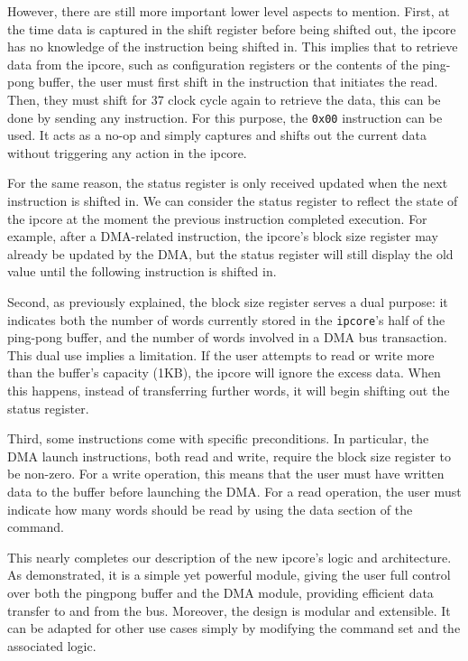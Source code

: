 \documentclass[a4paper,11pt,oneside]{report}
\begin{document}
However, there are still more important lower level aspects to mention. 
First, at the time data is captured in the shift register before being shifted out, 
the ipcore has no knowledge of the instruction being shifted in. 
This implies that to retrieve data from the ipcore, such as configuration registers 
or the contents of the ping-pong buffer, the user must first shift in the instruction that initiates the read. 
Then, they must shift for 37 clock cycle again to retrieve the data, this can be done by sending any instruction.
For this purpose, the \texttt{0x00} instruction can be used. 
It acts as a no-op and simply captures and shifts out the current data without triggering any action in the ipcore.

For the same reason, the status register is only received updated when the next instruction is shifted in. 
We can consider the status register to reflect the state of the ipcore 
at the moment the previous instruction completed execution. 
For example, after a DMA-related instruction, 
the ipcore's block size register may already be updated by the DMA, 
but the status register will still display the old value until the following instruction is shifted in.


Second, as previously explained, the block size register serves a dual purpose:
it indicates both the number of words currently stored in the \texttt{ipcore}'s half of the ping-pong buffer,
and the number of words involved in a DMA bus transaction.
This dual use implies a limitation. If the user attempts to read or write more than the buffer's capacity (1KB), 
the ipcore will ignore the excess data. When this happens, instead of transferring further words,
it will begin shifting out the status register.

Third, some instructions come with specific preconditions. 
In particular, the DMA launch instructions, both read and write, require the block size register to be non-zero.
For a write operation, this means that the user must have written data to the buffer before launching the DMA.
For a read operation, the user must indicate how many words should be read by using the data section of the command.

This nearly completes our description of the new ipcore's logic and architecture. 
As demonstrated, it is a simple yet powerful module, giving the user full control over both the pingpong buffer and the DMA module, providing efficient data transfer to and from the bus.
Moreover, the design is modular and extensible. 
It can be adapted for other use cases simply by modifying the command set and the associated logic.
\end{document}
